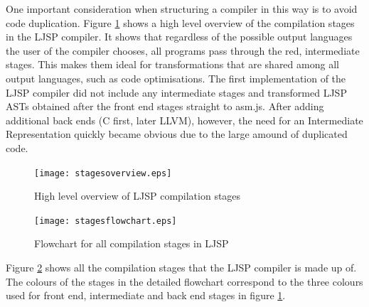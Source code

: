 \documentclass[11pt]{report}
\begin{document}
One important consideration when structuring a compiler in this way is to avoid code duplication. Figure \ref{highlevelstages} shows a high level overview of the compilation stages in the LJSP compiler. It shows that regardless of the possible output languages the user of the compiler chooses, all programs pass through the red, intermediate stages. This makes them ideal for transformations that are shared among all output languages, such as code optimisations. The first implementation of the LJSP compiler did not include any intermediate stages and transformed LJSP ASTs obtained after the front end stages straight to asm.js. After adding additional back ends (C first, later LLVM), however, the need for an Intermediate Representation quickly became obvious due to the large amound of duplicated code.

\begin{figure}[ht]
\begin{center}
\texttt{[image: stagesoverview.eps]}
\caption{High level overview of LJSP compilation stages}
\end{center}
\label{highlevelstages}
\end{figure}


\begin{figure}[ht]
\begin{center}
\texttt{[image: stagesflowchart.eps]}
\caption{Flowchart for all compilation stages in LJSP}
\end{center}
\label{stagesflowchart}
\end{figure}

Figure \ref{stagesflowchart} shows all the compilation stages that the LJSP compiler is made up of. The colours of the stages in the detailed flowchart correspond to the three colours used for front end, intermediate and back end stages in figure \ref{highlevelstages}. 
\end{document}
